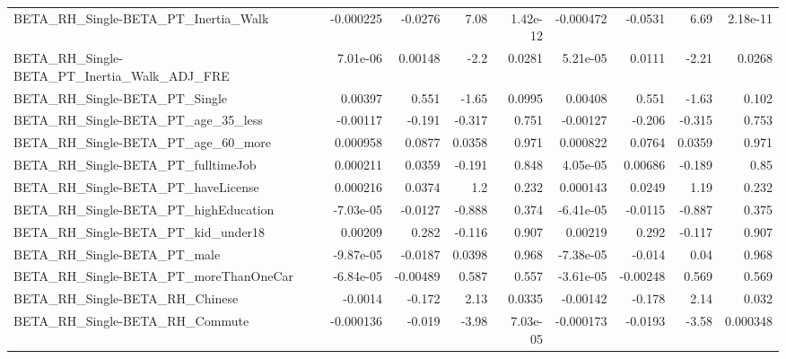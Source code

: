 \begin{tabular}{lrrrrrrrr}
BETA\_RH\_Single-BETA\_PT\_Inertia\_Walk                &   -0.000225 &      -0.0276 &     7.08 & 1.42e-12 &  -0.000472 &     -0.0531 &         6.69 &      2.18e-11 \\
BETA\_RH\_Single-BETA\_PT\_Inertia\_Walk\_ADJ\_FRE        &    7.01e-06 &      0.00148 &     -2.2 &   0.0281 &   5.21e-05 &      0.0111 &        -2.21 &        0.0268 \\
BETA\_RH\_Single-BETA\_PT\_Single                      &     0.00397 &        0.551 &    -1.65 &   0.0995 &    0.00408 &       0.551 &        -1.63 &         0.102 \\
BETA\_RH\_Single-BETA\_PT\_age\_35\_less                 &    -0.00117 &       -0.191 &   -0.317 &    0.751 &   -0.00127 &      -0.206 &       -0.315 &         0.753 \\
BETA\_RH\_Single-BETA\_PT\_age\_60\_more                 &    0.000958 &       0.0877 &   0.0358 &    0.971 &   0.000822 &      0.0764 &       0.0359 &         0.971 \\
BETA\_RH\_Single-BETA\_PT\_fulltimeJob                 &    0.000211 &       0.0359 &   -0.191 &    0.848 &   4.05e-05 &     0.00686 &       -0.189 &          0.85 \\
BETA\_RH\_Single-BETA\_PT\_haveLicense                 &    0.000216 &       0.0374 &      1.2 &    0.232 &   0.000143 &      0.0249 &         1.19 &         0.232 \\
BETA\_RH\_Single-BETA\_PT\_highEducation               &   -7.03e-05 &      -0.0127 &   -0.888 &    0.374 &  -6.41e-05 &     -0.0115 &       -0.887 &         0.375 \\
BETA\_RH\_Single-BETA\_PT\_kid\_under18                 &     0.00209 &        0.282 &   -0.116 &    0.907 &    0.00219 &       0.292 &       -0.117 &         0.907 \\
BETA\_RH\_Single-BETA\_PT\_male                        &   -9.87e-05 &      -0.0187 &   0.0398 &    0.968 &  -7.38e-05 &      -0.014 &         0.04 &         0.968 \\
BETA\_RH\_Single-BETA\_PT\_moreThanOneCar              &   -6.84e-05 &     -0.00489 &    0.587 &    0.557 &  -3.61e-05 &    -0.00248 &        0.569 &         0.569 \\
BETA\_RH\_Single-BETA\_RH\_Chinese                     &     -0.0014 &       -0.172 &     2.13 &   0.0335 &   -0.00142 &      -0.178 &         2.14 &         0.032 \\
BETA\_RH\_Single-BETA\_RH\_Commute                     &   -0.000136 &       -0.019 &    -3.98 & 7.03e-05 &  -0.000173 &     -0.0193 &        -3.58 &      0.000348 \\

\end{tabular}
